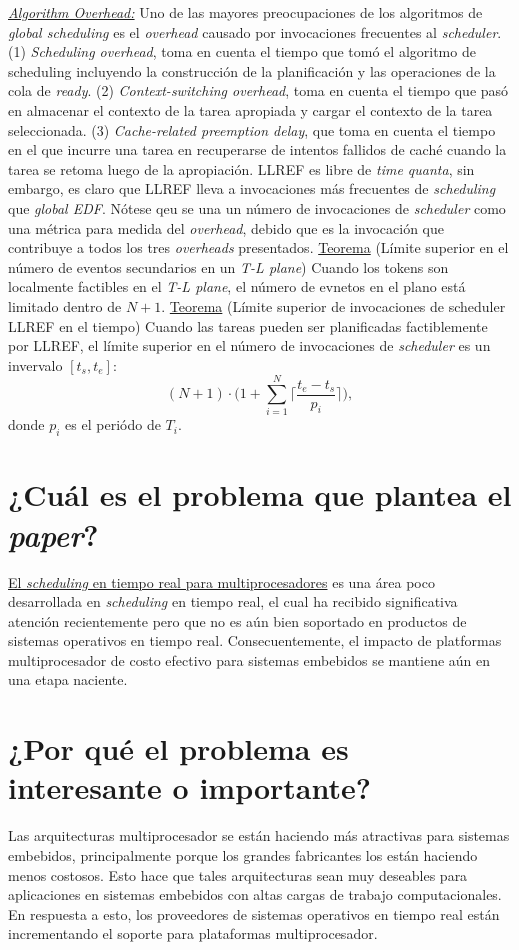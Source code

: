 \underline{\emph{Algorithm Overhead:}} Uno de las mayores preocupaciones de los algoritmos de \emph{global scheduling} es el \emph{overhead} causado por invocaciones frecuentes al \emph{scheduler}. (1) \emph{Scheduling overhead}, toma en cuenta el tiempo que tomó el algoritmo de scheduling incluyendo la construcción de la planificación y las operaciones de la cola de \emph{ready}. (2) \emph{Context-switching overhead}, toma en cuenta el tiempo que pasó en almacenar el contexto de la tarea apropiada y cargar el contexto de la tarea seleccionada. (3) \emph{Cache-related preemption delay}, que toma en cuenta el tiempo en el que incurre una tarea en recuperarse de intentos fallidos de caché cuando la tarea se retoma luego de la apropiación. LLREF es libre de \emph{time quanta}, sin embargo, es claro que LLREF lleva a invocaciones más frecuentes de \emph{scheduling} que \emph{global EDF}. Nótese qeu se una un número de invocaciones de \emph{scheduler} como una métrica para medida del \emph{overhead}, debido que es la invocación que contribuye a todos los tres \emph{overheads} presentados. \underline{Teorema} (Límite superior en el número de eventos secundarios en un \emph{T-L plane}) Cuando los tokens son localmente factibles en el \emph{T-L plane}, el número de evnetos en el plano está limitado dentro de $N + 1$. \underline{Teorema} (Límite superior de invocaciones de scheduler LLREF en el tiempo) Cuando las tareas pueden ser planificadas factiblemente por LLREF, el límite superior en el número de invocaciones de \emph{scheduler} es un invervalo $[t_s, t_e]$: $$(N+1) \cdot \bigg(1 + \sum_{i = 1}^{N} \lceil \frac{t_e - t_s}{p_i}\rceil \bigg),$$ donde $p_i$ es el periódo de $T_i$.

\section{¿Cuál es el problema que plantea el \textit{paper}?}
\underline{El \emph{scheduling} en tiempo real para multiprocesadores} es una área poco desarrollada en \emph{scheduling} en tiempo real, el cual ha recibido significativa atención recientemente pero que no es aún bien soportado en productos de sistemas operativos en tiempo real. Consecuentemente, el impacto de platformas multiprocesador de costo efectivo para sistemas embebidos se mantiene aún en una etapa naciente.

\section{¿Por qué el problema es interesante o importante?}
Las arquitecturas multiprocesador se están haciendo más atractivas para sistemas embebidos, principalmente porque los grandes fabricantes los están haciendo menos costosos. Esto hace que tales arquitecturas sean muy deseables para aplicaciones en sistemas embebidos con altas cargas de trabajo computacionales. En respuesta a esto, los proveedores de sistemas operativos en tiempo real están incrementando el soporte para plataformas multiprocesador. 

